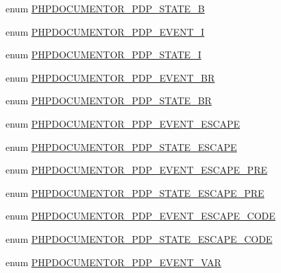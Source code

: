 \begin{DoxyCompactItemize}
\item 
enum \hyperlink{_parser_desc_cleanup_8inc_a86ca2c89d82f9971cd889ccbc7a149ef}{\-P\-H\-P\-D\-O\-C\-U\-M\-E\-N\-T\-O\-R\-\_\-\-P\-D\-P\-\_\-\-S\-T\-A\-T\-E\-\_\-\-B} 
\item 
enum \hyperlink{_parser_desc_cleanup_8inc_ab34d74d933cfe3b40973b99816a3b7ba}{\-P\-H\-P\-D\-O\-C\-U\-M\-E\-N\-T\-O\-R\-\_\-\-P\-D\-P\-\_\-\-E\-V\-E\-N\-T\-\_\-\-I} 
\item 
enum \hyperlink{_parser_desc_cleanup_8inc_a88fa7c7a5f9cf743fe35913bfa5deeb9}{\-P\-H\-P\-D\-O\-C\-U\-M\-E\-N\-T\-O\-R\-\_\-\-P\-D\-P\-\_\-\-S\-T\-A\-T\-E\-\_\-\-I} 
\item 
enum \hyperlink{_parser_desc_cleanup_8inc_a963d8a2f4650d4b50cf8a4a67bf642b7}{\-P\-H\-P\-D\-O\-C\-U\-M\-E\-N\-T\-O\-R\-\_\-\-P\-D\-P\-\_\-\-E\-V\-E\-N\-T\-\_\-\-B\-R} 
\item 
enum \hyperlink{_parser_desc_cleanup_8inc_aab8e0476fb8cf8215f28c420e1bc4cbb}{\-P\-H\-P\-D\-O\-C\-U\-M\-E\-N\-T\-O\-R\-\_\-\-P\-D\-P\-\_\-\-S\-T\-A\-T\-E\-\_\-\-B\-R} 
\item 
enum \hyperlink{_parser_desc_cleanup_8inc_a869132f6706ee085594b4c8daef8b045}{\-P\-H\-P\-D\-O\-C\-U\-M\-E\-N\-T\-O\-R\-\_\-\-P\-D\-P\-\_\-\-E\-V\-E\-N\-T\-\_\-\-E\-S\-C\-A\-P\-E} 
\item 
enum \hyperlink{_parser_desc_cleanup_8inc_af206f659d561c9bc36b4e8bf4b220123}{\-P\-H\-P\-D\-O\-C\-U\-M\-E\-N\-T\-O\-R\-\_\-\-P\-D\-P\-\_\-\-S\-T\-A\-T\-E\-\_\-\-E\-S\-C\-A\-P\-E} 
\item 
enum \hyperlink{_parser_desc_cleanup_8inc_a5dfe3924254a3d0feab3530de19eda1c}{\-P\-H\-P\-D\-O\-C\-U\-M\-E\-N\-T\-O\-R\-\_\-\-P\-D\-P\-\_\-\-E\-V\-E\-N\-T\-\_\-\-E\-S\-C\-A\-P\-E\-\_\-\-P\-R\-E} 
\item 
enum \hyperlink{_parser_desc_cleanup_8inc_a3cfecc95ec41766c7338c55a3c1b4210}{\-P\-H\-P\-D\-O\-C\-U\-M\-E\-N\-T\-O\-R\-\_\-\-P\-D\-P\-\_\-\-S\-T\-A\-T\-E\-\_\-\-E\-S\-C\-A\-P\-E\-\_\-\-P\-R\-E} 
\item 
enum \hyperlink{_parser_desc_cleanup_8inc_a1080d92f05f10cbd123d36eba046e3d5}{\-P\-H\-P\-D\-O\-C\-U\-M\-E\-N\-T\-O\-R\-\_\-\-P\-D\-P\-\_\-\-E\-V\-E\-N\-T\-\_\-\-E\-S\-C\-A\-P\-E\-\_\-\-C\-O\-D\-E} 
\item 
enum \hyperlink{_parser_desc_cleanup_8inc_acf135e216a2b16595d3f298db1570ea8}{\-P\-H\-P\-D\-O\-C\-U\-M\-E\-N\-T\-O\-R\-\_\-\-P\-D\-P\-\_\-\-S\-T\-A\-T\-E\-\_\-\-E\-S\-C\-A\-P\-E\-\_\-\-C\-O\-D\-E} 
\item 
enum \hyperlink{_parser_desc_cleanup_8inc_a481f1e32a87bac17839288f4fd9db6b5}{\-P\-H\-P\-D\-O\-C\-U\-M\-E\-N\-T\-O\-R\-\_\-\-P\-D\-P\-\_\-\-E\-V\-E\-N\-T\-\_\-\-V\-A\-R} 

\end{DoxyCompactItemize}
